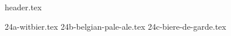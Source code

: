 \clearpage
{}
\divisorLine

{header.tex}

\begin{multicols}{2}

{24a-witbier.tex}
{24b-belgian-pale-ale.tex}
{24c-biere-de-garde.tex}

\end{multicols}